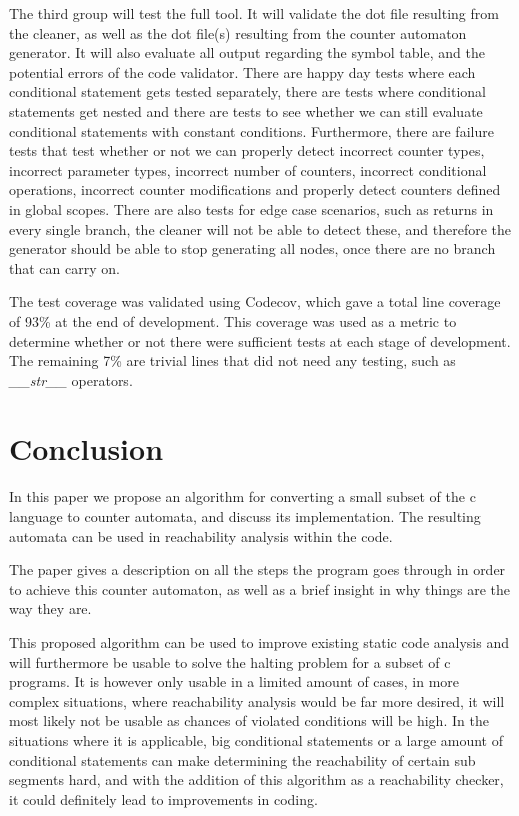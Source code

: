 \documentclass[12pt]{article}
\begin{document}
The third group will test the full tool. It will validate the dot file resulting from the cleaner, as well as the dot file(s) resulting from the counter automaton generator. It will also evaluate all output regarding the symbol table, and the potential errors of the code validator. There are happy day tests where each conditional statement gets tested separately, there are tests where conditional statements get nested and there are tests to see whether we can still evaluate conditional statements with constant conditions. Furthermore, there are failure tests that test whether or not we can properly detect incorrect counter types, incorrect parameter types, incorrect number of counters, incorrect conditional operations, incorrect counter modifications and properly detect counters defined in global scopes. There are also tests for edge case scenarios, such as returns in every single branch, the cleaner will not be able to detect these, and therefore the generator should be able to stop generating all nodes, once there are no branch that can carry on.

The test coverage was validated using Codecov, which gave a total line coverage of 93\% at the end of development. This coverage was used as a metric to determine whether or not there were sufficient tests at each stage of development. The remaining 7\% are trivial lines that did not need any testing, such as \textit{\_\_str\_\_} operators.

\section{Conclusion}
In this paper we propose an algorithm for converting a small subset of the c language to counter automata, and discuss its implementation. The resulting automata can be used in reachability analysis within the code. 

The paper gives a description on all the steps the program goes through in order to achieve this counter automaton, as well as a brief insight in why things are the way they are.

This proposed algorithm can be used to improve existing static code analysis and will furthermore be usable to solve the halting problem for a subset of c programs. It is however only usable in a limited amount of cases, in more complex situations, where reachability analysis would be far more desired, it will most likely not be usable as chances of violated conditions will be high. In the situations where it is applicable, big conditional statements or a large amount of conditional statements can make determining the reachability of certain sub segments hard, and with the addition of this algorithm as a reachability checker, it could definitely lead to improvements in coding.
\end{document}
